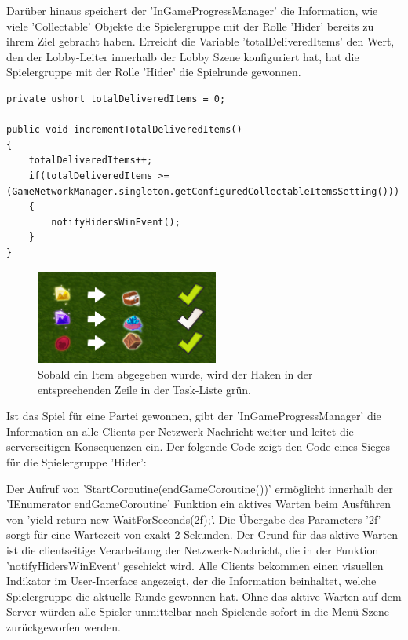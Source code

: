Darüber hinaus speichert der 'InGameProgressManager' die Information, wie viele 'Collectable' Objekte die Spielergruppe mit der Rolle 'Hider' bereits zu ihrem Ziel gebracht haben. Erreicht die Variable 'totalDeliveredItems' den Wert, den der Lobby-Leiter innerhalb der Lobby Szene konfiguriert hat, hat die Spielergruppe mit der Rolle 'Hider' die Spielrunde gewonnen.

\begin{lstlisting}[caption= InGameProgressManager.cs Item Devlivery Handling]
private ushort totalDeliveredItems = 0;

public void incrementTotalDeliveredItems()
{
	totalDeliveredItems++;
	if(totalDeliveredItems >= (GameNetworkManager.singleton.getConfiguredCollectableItemsSetting()))
	{
		notifyHidersWinEvent();
	}
}	
\end{lstlisting}

\begin{figure}[H]
	\centering
	\includegraphics[width=60mm]{images/prototyp_task_list_progress.png}
	\caption[Updated Task List]{Sobald ein Item abgegeben wurde, wird der Haken in der entsprechenden Zeile in der Task-Liste grün.}
	\label{pic:prototyp_task_list_progress}
\end{figure}

Ist das Spiel für eine Partei gewonnen, gibt der 'InGameProgressManager' die Information an alle Clients per Netzwerk-Nachricht weiter und leitet die serverseitigen Konsequenzen ein. Der folgende Code zeigt den Code eines Sieges für die Spielergruppe 'Hider': 

Der Aufruf von 'StartCoroutine(endGameCoroutine())' ermöglicht innerhalb der 'IEnumerator endGameCoroutine' Funktion ein aktives Warten beim Ausführen von 'yield return new WaitForSeconds(2f);'. Die Übergabe des Parameters '2f' sorgt für eine Wartezeit von exakt 2 Sekunden. Der Grund für das aktive Warten ist die clientseitige Verarbeitung der Netzwerk-Nachricht, die in der Funktion 'notifyHidersWinEvent' geschickt wird. Alle Clients bekommen einen visuellen Indikator im User-Interface angezeigt, der die Information beinhaltet, welche Spielergruppe die aktuelle Runde gewonnen hat. Ohne das aktive Warten auf dem Server würden alle Spieler unmittelbar nach Spielende sofort in die Menü-Szene zurückgeworfen werden.

